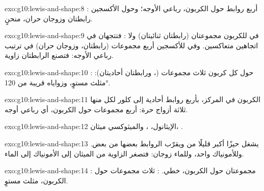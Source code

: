 \begin{solution}{exo:g10:lewis-and-shape:8}
: أربع روابط حول الكربون،
رباعي الأوجه؛ وحول الأكسجين رابطتان وزوجان حران، منحنٍ.
\end{solution}

\begin{solution}{exo:g10:lewis-and-shape:9}
في  للكربون مجموعتان (رابطتان ثنائيتان) ولا : فتتجهان في
اتجاهين متعاكسين. وفي  للأكسجين أربع مجموعات (رابطتان، وزوجان حران)
في ترتيب رباعي الأوجه: فتصنع الرابطتان
زاوية.
\end{solution}

\begin{solution}{exo:g10:lewis-and-shape:10}
: حول كل كربون ثلاث مجموعات
(، ورابطتان أحاديتان): مثلث مستوٍ، وزواياه قريبة من
\ang{120}.
\end{solution}

\begin{solution}{exo:g10:lewis-and-shape:11}
الكربون في المركز، بأربع روابط أحادية إلى  كلور لكل منها ثلاثة أزواج حرة:
أربع مجموعات حول الكربون، أي رباعي أوجه.
\end{solution}

\begin{solution}{exo:g10:lewis-and-shape:12}
الإيثانول، ،
والميثوكسي ميثان،
.
\end{solution}

\begin{solution}{exo:g10:lewis-and-shape:13}
 يشغل حيزًا أكبر قليلًا من  ويقرّب الروابط بعضها من بعض.
وللأمونياك  واحد، وللماء زوجان: فتصغر الزاوية من الميثان إلى الأمونياك
إلى الماء.
\end{solution}

\begin{solution}{exo:g10:lewis-and-shape:14}
: مجموعتان حول الكربون، خطي.
: ثلاث مجموعات حول الكربون، مثلث
مستوٍ.
\end{solution}

